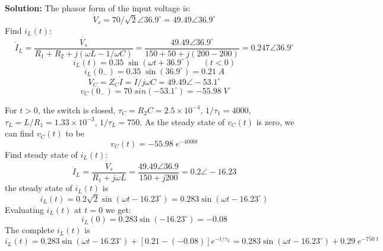 \begin{enumerate}

{\bf Solution:} 
The phasor form of the input voltage is:
\[ \dot{V}_s=70/\sqrt{2}\angle 36.9^\circ =49.49\angle 36.9^\circ \]
Find $i_L(t)$:
\[ \dot{I}_L=\frac{\dot{V_s}}{R_1+R_2+j(\omega L-1/\omega C)}
=\frac{49.49\angle 36.9^\circ}{150+50+j(200-200)}=0.247\angle 36.9^\circ \]
\[ i_L(t)=0.35\;\sin(\omega t+36.9^\circ)\;\;\;\;\;(t<0) \]
\[ i_L(0_-)=0.35\;\sin(36.9^\circ)=0.21\;A \]
\[ \dot{V}_C=Z_C \dot{I}=\dot{I}/j\omega C =49.49\angle -53.1^\circ \]
\[ v_C(0_-)=70\;sin(-53.1^\circ)=-55.98\;V \]

For $t>0$, the switch is closed, $\tau_C=R_2C=2.5\times 10^{-4}$, 
$1/\tau_1=4000$, $\tau_L=L/R_1=1.33\times 10^{-3}$, $1/\tau_L=750$.
As the steady state of $v_C(t)$ is zero, we can find $v_C(t)$ to be
\[ v_C(t)=-55.98\;e^{-4000  t} \]
Find steady state of $i_L(t)$:
\[ \dot{I}_L=\frac{\dot{V}_s}{R_1+j\omega L}=\frac{49.49\angle 36.9}{150+j200}
=0.2\angle -16.23 \]
the steady state of $i_L(t)$ is
\[ i_L(t)=0.2\sqrt{2}\sin(\omega t-16.23^\circ)=0.283\sin(\omega t-16.23^\circ) \]
Evaluating $i_L(t)$ at $t=0$ we get:
\[ i_L(0)=0.283\sin(-16.23^\circ)=-0.08 \]
The complete $i_L(t)$ is
\[ i_L(t)=0.283\sin(\omega t-16.23^\circ)+[0.21-(-0.08)]e^{-t/\tau_L}
=0.283\sin(\omega t-16.23^\circ)+0.29\;e^{-750\;t} \]

%





\end{enumerate}
